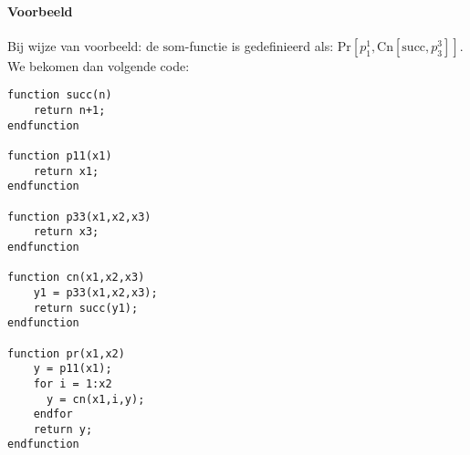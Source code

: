 \documentclass[fleqn]{article}
\begin{document}
\paragraph{Voorbeeld}
Bij wijze van voorbeeld: de $\mbox{som}$-functie is gedefinieerd als: $\mbox{Pr}\left[p^1_1,\mbox{Cn}\left[\mbox{succ},p^3_3\right]\right]$. We bekomen dan volgende code:
\begin{verbatim}
function succ(n)
    return n+1;
endfunction

function p11(x1)
    return x1;
endfunction

function p33(x1,x2,x3)
    return x3;
endfunction

function cn(x1,x2,x3)
    y1 = p33(x1,x2,x3);
    return succ(y1);
endfunction

function pr(x1,x2)
    y = p11(x1);
    for i = 1:x2
      y = cn(x1,i,y);
    endfor
    return y;
endfunction

\end{verbatim}
\end{document}
